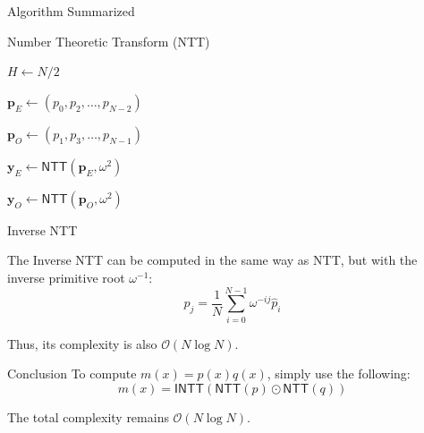 \documentclass{zkdl-presentation-template}
\begin{document}
    \begin{frame}{Algorithm Summarized}
        \begin{algorithm}[H]
            \caption{Number Theoretic Transform (NTT)}
        
        
            $H \gets N/2$ 
        
            $\boldsymbol{p}_{E} \gets (p_0,p_2,\dots,p_{N-2})$ 
        
            $\boldsymbol{p}_{O} \gets (p_1,p_3,\dots,p_{N-1})$ 
        
            $\boldsymbol{y}_E \gets \mathsf{NTT}(\boldsymbol{p}_{E}, \omega^2)$ 
        
            $\boldsymbol{y}_O \gets \mathsf{NTT}(\boldsymbol{p}_O, \omega^2)$ 
        
        \end{algorithm}
    \end{frame}

    \begin{frame}{Inverse NTT}
        \begin{theorem}
            The Inverse NTT can be computed in the same way as NTT, but with the 
            inverse primitive root $\omega^{-1}$:
            \begin{equation*}
                p_j = \frac{1}{N}\sum_{i=0}^{N-1}\omega^{-ij}\hat{p}_i
            \end{equation*}

            Thus, its complexity is also $\mathcal{O}(N \log N)$.
        \end{theorem}

        \begin{block}{Conclusion}
            To compute $m(x) = p(x)q(x)$, simply use the following:
            \begin{equation*}
                m(x) = \mathsf{INTT}(\mathsf{NTT}(p) \odot \mathsf{NTT}(q))
            \end{equation*}

            The total complexity remains $\mathcal{O}(N \log N)$.
        \end{block}
    \end{frame}
\end{document}
